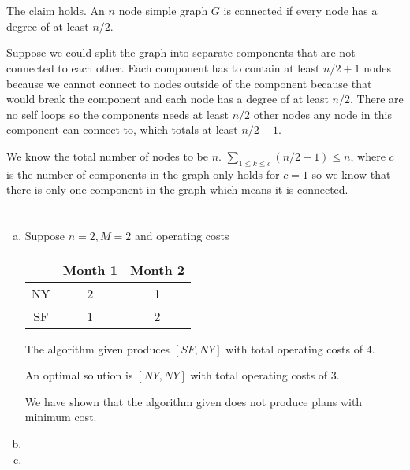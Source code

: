 \documentclass[12pt, a4paper]{article}
\begin{document}
\section{} %

\section{} %
The claim holds. An $n$ node simple graph $G$ is connected if every node has a degree of at least $n/2$.

Suppose we could split the graph into separate components that are not connected to each other. Each component has to contain at least $n/2 + 1$ nodes because we cannot connect to nodes outside of the component because that would break the component and each node has a degree of at least $n/2$. There are no self loops so the components needs at least $n/2$ other nodes any node in this component can connect to, which totals at least $n/2 + 1$.

We know the total number of nodes to be $n$. $\sum_{1 \leq k \leq c} (n/2 + 1) \leq n$, where $c$ is the number of components in the graph only holds for $c = 1$ so we know that there is only one component in the graph which means it is connected.

\section{} %
\begin{enumerate}[(a)]
	\item %
	Suppose $n = 2, M = 2$ and operating costs\\
	\begin{tabular}{|c||c|c|}
		\hline
		& Month 1 & Month 2\\
		\hline
		NY & 2 & 1\\
		\hline
		SF & 1 & 2\\
		\hline
	\end{tabular}

	The algorithm given produces $[SF, NY]$ with total operating costs of $4$.

	An optimal solution is $[NY, NY]$ with total operating costs of $3$.

	We have shown that the algorithm given does not produce plans with minimum cost.

	\item %
	\item %
\end{enumerate}
\end{document}
